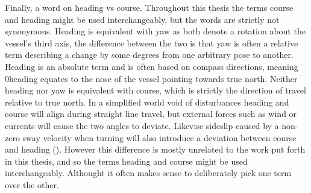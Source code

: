 Finally, a word on heading vs course. Throughout this thesis the terms course and heading might be used interchangeably, but the words are strictly not synonymous.
Heading is equivalent with yaw as both denote a rotation about the vessel's third axis, the difference between the two is that yaw is often a relative term describing
a change by some degrees from one arbitrary pose to another. Heading is an absolute term and is often based on compass directions, meaning 0\textdegree heading
equates to the nose of the vessel pointing towards true north. Neither heading nor yaw is equivalent with course, which is strictly the direction
of travel relative to true north. In a simplified world void of disturbances heading and course will align during straight line
travel, but external forces such as wind or currents will cause the two angles to deviate. Likevise sideslip caused by a non-zero sway velocity when turning will 
also introduce a deviation between course and heading (\cite{fossen2011handbook}). However this difference is mostly unrelated to the work put forth in this thesis, 
and so the terms heading and course might be used interchangeably. Althought it often makes sense to deliberately pick one
term over the other.


